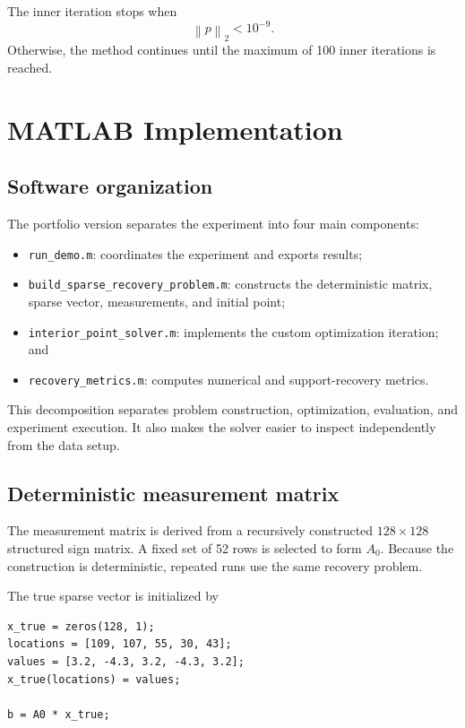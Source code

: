 \documentclass[11pt]{article}
\newcommand{\norm}[1]{\left\lVert #1 \right\rVert}
\begin{document}
The inner iteration stops when
\begin{equation}
\label{eq:stop}
\norm{p}_2<10^{-9}.
\end{equation}
Otherwise, the method continues until the maximum of 100 inner iterations is reached.

\section{MATLAB Implementation}
\subsection{Software organization}

The portfolio version separates the experiment into four main components:
\begin{itemize}[leftmargin=1.5em]
  \item \texttt{run\_demo.m}: coordinates the experiment and exports results;
  \item \texttt{build\_sparse\_recovery\_problem.m}: constructs the deterministic matrix, sparse vector, measurements, and initial point;
  \item \texttt{interior\_point\_solver.m}: implements the custom optimization iteration; and
  \item \texttt{recovery\_metrics.m}: computes numerical and support-recovery metrics.
\end{itemize}

This decomposition separates problem construction, optimization, evaluation, and experiment execution. It also makes the solver easier to inspect independently from the data setup.

\subsection{Deterministic measurement matrix}

The measurement matrix is derived from a recursively constructed $128\times128$ structured sign matrix. A fixed set of 52 rows is selected to form $A_0$. Because the construction is deterministic, repeated runs use the same recovery problem.

The true sparse vector is initialized by
\begin{lstlisting}[caption={Ground-truth sparse vector construction.}]
x_true = zeros(128, 1);
locations = [109, 107, 55, 30, 43];
values = [3.2, -4.3, 3.2, -4.3, 3.2];
x_true(locations) = values;

b = A0 * x_true;
\end{lstlisting}
\end{document}
